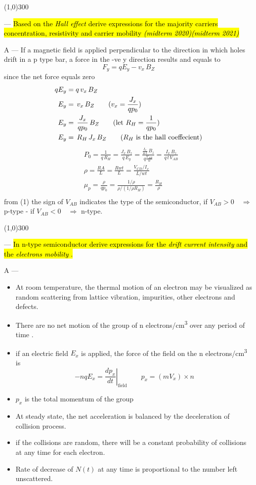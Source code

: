 \documentclass[12pt,a4paper]{article}
\newcounter{question}
\newcommand\Que[1]{
   \line(1,0){300}
   \leavevmode\par
   \stepcounter{question}
   \noindent
   \fbox{\thequestion. Q} --- \hl{#1}\par}
\newcommand\Ans[2][]{%
    \leavevmode\par\noindent
   {\leftskip16pt
    A --- \textbf{#1}#2\par}}
\begin{document}
\begin{large}
\Que{
Based on the \emph{Hall effect} derive expressions for the majority carriers concentration, resistivity and carrier mobility \hfill \textit{(midterm 2020)(midterm 2021)} 
}
\Ans{
If a magnetic field is applied perpendicular to the direction in which holes drift in a p type bar, a force in the -ve y direction results and equals to $$F_y = qE_y - v_x \, B_Z$$
since the net force equals zero 
\begin{align*}
qE_y &=q\, v_x \, B_Z\\
E_y &=\, v_x \, B_Z \tag{$v_x = \dfrac{J_x}{qp_0}$}\\
E_y &=\, \frac{J_x}{qp_0} \, B_Z \tag{let $R_H = \dfrac{1}{qp_0}$}\\
E_y &=\, R_H \, J_x \, B_Z\tag{$R_H$ is the hall coeffecient}\\
\end{align*}
\begin{align*}
&P_0 = \frac{1}{q\,R_H}=\frac{J_x\,B_z}{q\,E_y} = \frac{\frac{I_x}{w\,t}\,B_z}{q\frac{V_{AB}}{w}} = \frac{I_x\,B_z}{q\,t\,V_{AB}} \tag{1}\\
&\rho = \frac{RA}{L} = \frac{Rwt}{L}= \frac{V_{CD}/I_x}{L/wt}\\
&\mu_p = \frac{\rho}{qp_0} = \frac{1/\rho}{\rho/(1/\rho R_H)} = \frac{R_H}{\rho}\\
\end{align*}
from (1) the sign of $V_{AB}$ indicates the type of the semiconductor, if $V_{AB}>0\quad \Rightarrow$ p-type -   if $V_{AB}<0\quad \Rightarrow$ n-type.


}
\Que{
In n-type semiconductor derive expressions for the \emph{drift current intensity} and the \emph{electrons mobility} .
}
\Ans{
\begin{itemize}
\item At room temperature, the thermal motion of an electron may be visualized as random scattering from lattice vibration, impurities, other electrons and defects.

\item There are no net motion of the group of n electrons/cm\textsuperscript{3} over any period of time .

\item if an electric field $E_x$ is applied, the force of the field on the n electrons/cm\textsuperscript{3} is $$-nqE_x = \left. \frac{dp_x}{dt}\right|_{\text{field}} \quad \quad p_x = (mV_x)\times n$$
\item $p_x$ is the total momentum of the group
\item At steady state, the net acceleration is balanced by the deceleration of collision process.
\item if the collisions are random, there will be a constant probability of collisions at any time for each electron.
\item Rate of decrease of $N(t)$ at any time is proportional to the number left unscattered.


\end{itemize}}
\end{large}
\end{document}

